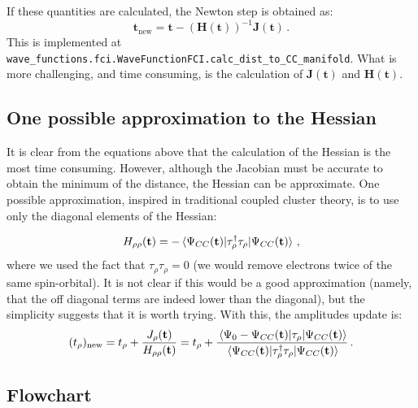 If these quantities are calculated, the Newton step is obtained as:
\begin{equation}\label{eq:cc_minD_update}
  \mathbf{t}_\text{new} =
  \mathbf{t} - \left(\mathbf{H}(\mathbf{t})\right)^{-1}\mathbf{J}(\mathbf{t})\,.
\end{equation}
This is implemented at \texttt{wave\_functions.fci.WaveFunctionFCI.calc\_dist\_to\_CC\_manifold}.
What is more challenging, and time consuming, is the calculation of $\mathbf{J}(\mathbf{t})$ and
$\mathbf{H}(\mathbf{t})$.

\subsection{One possible approximation to the Hessian}
\hypertarget{sec:cc_man_appr_hess}{}
\label{sec:cc_man_appr_hess}

It is clear from the equations above that the calculation of the Hessian is the most time consuming.
However, although the Jacobian must be accurate to obtain the minimum of the distance,
the Hessian can be approximate.
One possible approximation, inspired in traditional coupled cluster theory,
is to use only the diagonal elements of the Hessian:

\begin{equation}\label{eq:cc_minD_hess_diag}
  \begin{split}
    H_{\rho\rho}(\mathbf{t}) =
    - \mel{\Psi_{CC}(\mathbf{t})}{\tau_\rho^\dagger\tau_\rho}{\Psi_{CC}(\mathbf{t})}\,,
  \end{split}
\end{equation}
where we used the fact that $\tau_\rho\tau_\rho = 0$
(we would remove electrons twice of the same spin-orbital).
It is not clear if this would be a good approximation
(namely, that the off diagonal terms are indeed lower than the diagonal),
but the simplicity suggests that it is worth trying.
With this, the amplitudes update is:
\begin{equation}\label{eq:cc_minD_update}
  (t_\rho)_\text{new}
  = t_\rho + \frac{J_\rho(\mathbf{t})}{H_{\rho\rho}(\mathbf{t})}
  = t_\rho
  + \frac{\mel{\Psi_0 - \Psi_{CC}(\mathbf{t})}{\tau_\rho}{\Psi_{CC}(\mathbf{t})}}
  {\mel{\Psi_{CC}(\mathbf{t})}{\tau_\rho^\dagger\tau_\rho}{\Psi_{CC}(\mathbf{t})}}\,.
\end{equation}



\newpage
\subsection{Flowchart}



